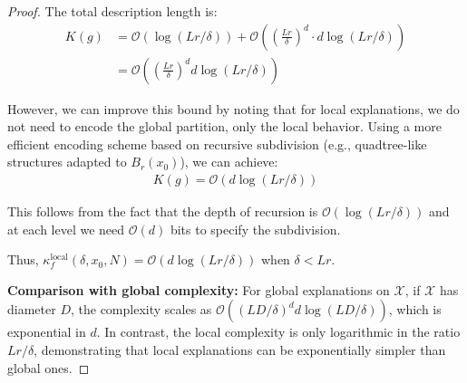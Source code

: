 \documentclass[10pt,a4paper]{amsart}
\begin{document}
\begin{proof}
The total description length is:
\begin{align}
K(g) &= \mathcal{O}(\log(Lr/\delta)) + \mathcal{O}\left(\left(\frac{Lr}{\delta}\right)^d \cdot d \log(Lr/\delta)\right) \\
&= \mathcal{O}\left(\left(\frac{Lr}{\delta}\right)^d d \log(Lr/\delta)\right)
\end{align}

However, we can improve this bound by noting that for local explanations, we do not need to encode the global partition, only the local behavior. Using a more efficient encoding scheme based on recursive subdivision (e.g., quadtree-like structures adapted to $B_r(x_0)$), we can achieve:
\begin{align}
K(g) = \mathcal{O}(d \log(Lr/\delta))
\end{align}

This follows from the fact that the depth of recursion is $\mathcal{O}(\log(Lr/\delta))$ and at each level we need $\mathcal{O}(d)$ bits to specify the subdivision.

Thus, $\kappa_f^{\text{local}}(\delta, x_0, N) = \mathcal{O}(d \log(Lr/\delta))$ when $\delta < Lr$.

\textbf{Comparison with global complexity:} For global explanations on $\mathcal{X}$, if $\mathcal{X}$ has diameter $D$, the complexity scales as $\mathcal{O}((LD/\delta)^d d \log(LD/\delta))$, which is exponential in $d$. In contrast, the local complexity is only logarithmic in the ratio $Lr/\delta$, demonstrating that local explanations can be exponentially simpler than global ones.
\end{proof}
\end{document}
